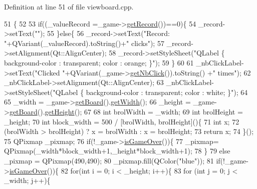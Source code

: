 Definition at line 51 of file viewboard.\+cpp.


\begin{DoxyCode}
51                           \{
52 
53     \textcolor{keywordflow}{if}((\_valueRecord =\_game->\hyperlink{classoli_1_1_floodgame_af0084c4fecf2b51da6aed1f73de05e9e}{getRecord}())==0)\{
54         \_record->setText(\textcolor{stringliteral}{""});
55     \}\textcolor{keywordflow}{else}\{
56         \_record->setText(\textcolor{stringliteral}{"Record: "}+QVariant(\_valueRecord).toString()+\textcolor{stringliteral}{" clicks"});
57         \_record->setAlignment(Qt::AlignCenter);
58         \_record->setStyleSheet(\textcolor{stringliteral}{"QLabel \{ background-color : transparent; color : orange; \}"});
59     \}
60 
61     \_nbClickLabel->setText(\textcolor{stringliteral}{"Clicked "}+QVariant(\_game->\hyperlink{classoli_1_1_floodgame_aae08dd4e048b1521797c44a68d08f250}{getNbClick}()).toString() +\textcolor{stringliteral}{" times"});
62     \_nbClickLabel->setAlignment(Qt::AlignCenter);
63     \_nbClickLabel->setStyleSheet(\textcolor{stringliteral}{"QLabel \{ background-color : transparent; color : white; \}"});
64 
65     \_width = \_game->\hyperlink{classoli_1_1_floodgame_a4775f2321f034778d4de93a888d2283b}{getBoard}().\hyperlink{classoli_1_1_board_a228d72d2aa8a9df2f545ecef14e72a0d}{getWidth}();
66     \_height = \_game->\hyperlink{classoli_1_1_floodgame_a4775f2321f034778d4de93a888d2283b}{getBoard}().\hyperlink{classoli_1_1_board_a17dce7dacfe888f52dfad0468ae51ace}{getHeight}();
67 
68     \textcolor{keywordtype}{int} brolWidth = \_width;
69     \textcolor{keywordtype}{int} brolHeight = \_height;
70     \textcolor{keywordtype}{int} block\_width = 500 / [brolWidth, brolHeight]()\{
71         \textcolor{keywordtype}{int} x;
72         (brolWidth > brolHeight) ? x = brolWidth : x = brolHeight;
73         \textcolor{keywordflow}{return} x;
74     \}();
75     QPixmap \_pixmap;
76     \textcolor{keywordflow}{if}(!\_game->\hyperlink{classoli_1_1_floodgame_adfcb41900bae06b64a8d4d77164b67d5}{isGameOver}())\{
77         \_pixmap= QPixmap(\_width*block\_width+1,\_height*block\_width+1);
78     \}
79     \textcolor{keywordflow}{else} \_pixmap = QPixmap(490,490);
80     \_pixmap.fill(QColor(\textcolor{stringliteral}{"blue"}));
81     \textcolor{keywordflow}{if}(!\_game->\hyperlink{classoli_1_1_floodgame_adfcb41900bae06b64a8d4d77164b67d5}{isGameOver}())\{
82         \textcolor{keywordflow}{for}(\textcolor{keywordtype}{int} i = 0; i < \_height; i++)\{
83             \textcolor{keywordflow}{for} (\textcolor{keywordtype}{int} j = 0; j < \_width; j++)\{

\end{DoxyCode}
